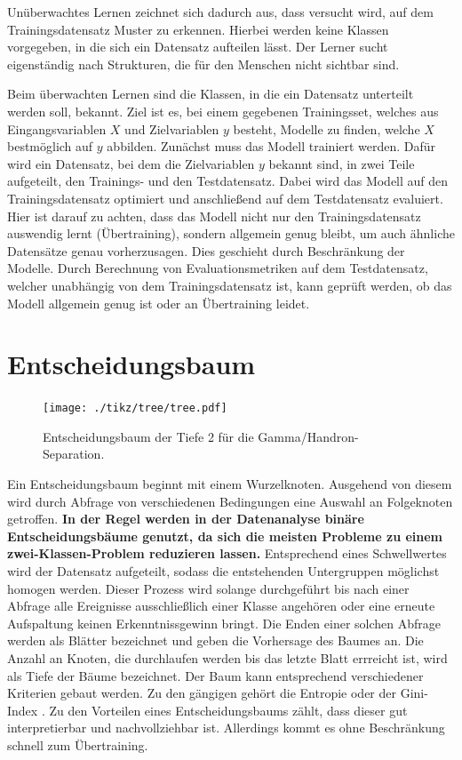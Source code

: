 Unüberwachtes Lernen zeichnet sich dadurch aus, dass versucht wird, auf dem Trainingsdatensatz Muster zu erkennen. 
Hierbei werden keine Klassen vorgegeben, in die sich ein Datensatz aufteilen lässt. 
Der Lerner sucht eigenständig nach Strukturen, die für den Menschen nicht sichtbar sind.

Beim überwachten Lernen sind die Klassen, in die ein Datensatz unterteilt werden soll, bekannt.
Ziel ist es, bei einem gegebenen Trainingsset, welches aus Eingangsvariablen $X$ und Zielvariablen $y$ besteht, Modelle zu finden, welche $X$ bestmöglich auf $y$ abbilden. 
Zunächst muss das Modell trainiert werden. 
Dafür wird ein Datensatz, bei dem die Zielvariablen $y$ bekannt sind, in zwei Teile aufgeteilt, den Trainings- und den Testdatensatz. 
Dabei wird das Modell auf den Trainingsdatensatz optimiert und anschließend auf dem Testdatensatz evaluiert. 
Hier ist darauf zu achten, dass das Modell nicht nur den Trainingsdatensatz auswendig lernt (Übertraining), sondern allgemein genug bleibt, um auch ähnliche Datensätze genau vorherzusagen. 
Dies geschieht durch Beschränkung der Modelle. 
Durch Berechnung von Evaluationsmetriken auf dem Testdatensatz, welcher unabhängig von dem Trainingsdatensatz ist, kann geprüft werden, ob das Modell allgemein genug ist oder an Übertraining leidet.
\section{Entscheidungsbaum}
\begin{figure}
  \centering
  \texttt{[image: ./tikz/tree/tree.pdf]}
  \caption{Entscheidungsbaum der Tiefe 2 für die Gamma/Handron-Separation.}
\end{figure}
Ein Entscheidungsbaum beginnt mit einem Wurzelknoten. Ausgehend von diesem wird durch Abfrage von verschiedenen Bedingungen eine Auswahl an Folgeknoten getroffen. 
\textbf{In der Regel werden in der Datenanalyse binäre Entscheidungsbäume genutzt, da sich die meisten Probleme zu einem zwei-Klassen-Problem reduzieren lassen.}
Entsprechend eines Schwellwertes wird der Datensatz aufgeteilt, sodass die entstehenden Untergruppen möglichst homogen werden. 
Dieser Prozess wird solange durchgeführt bis nach einer Abfrage alle Ereignisse ausschließlich einer Klasse angehören oder eine erneute Aufspaltung keinen Erkenntnissgewinn bringt. Die Enden einer solchen Abfrage werden als Blätter bezeichnet und geben die Vorhersage des Baumes an.
Die Anzahl an Knoten, die durchlaufen werden bis das letzte Blatt errreicht ist, wird als Tiefe der Bäume bezeichnet.
Der Baum kann entsprechend verschiedener Kriterien gebaut werden.
Zu den gängigen gehört die Entropie oder der Gini-Index \cite{model}. 
Zu den Vorteilen eines Entscheidungsbaums zählt, dass dieser gut interpretierbar und nachvollziehbar ist. 
Allerdings kommt es ohne Beschränkung schnell zum Übertraining.
